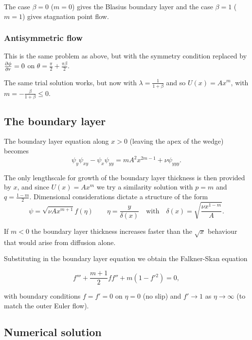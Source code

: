 \documentclass{notes}
\theoremstyle{plain}
\begin{document}
The case $\beta =0$ ($m = 0$) gives the Blasius boundary layer and
the case $\beta = 1$ ($m = 1$) gives stagnation point flow.

\subsubsection*{Antisymmetric flow}

\vspace{1.5in}

This is the same problem as above, but with the symmetry condition replaced
by $\frac{\partial \phi}{\partial r} = 0$ on $\theta = \frac{\pi}{2} + \frac{\pi \beta}{2}$.

The same trial solution works, but now with $\lambda = \frac{1}{1 + \beta}$
and so $U(x) = A x^m$, with $m = - \frac{\beta}{1+\beta} \le 0$.

\subsection{The boundary layer}

The boundary layer equation along $x > 0$ (leaving the apex of the wedge)
becomes
\[
\psi_y \psi_{x y} - \psi_x \psi_{y y} = m A^2 x^{2 m - 1} + \nu \psi_{y y y}.
\]

The only lengthscale for growth of the boundary layer thickness is then
provided by $x$, and since $U(x) = A x^m$ we try a similarity solution
with $p = m$ and $q = \frac{1 - m}{2}$.  Dimensional considerations
dictate a structure of the form
\[
\psi = \sqrt{\nu A x^{m + 1}} f(\eta) \qquad \eta = \frac{y}{\delta(x)}
\quad \text{with} \quad \delta(x) = \sqrt{\frac{\nu x^{1-m}}{A}}.
\]

If $m < 0$ the boundary layer thickness increases faster than the
$\sqrt{x}$ behaviour that would arise from diffusion alone.

Substituting in the boundary layer equation we obtain the Falkner-Skan
equation

\begin{equation}\label{eq:FalSkan}
f''' + \frac{m + 1}{2} f f'' + m \left(1 - f'{}^2\right) = 0,
\end{equation}

with boundary conditions $f = f' = 0$ on $\eta = 0$ (no slip) and
$f' \to 1$ as $\eta \to \infty$ (to match the outer Euler flow).

\subsection{Numerical solution}
\end{document}
